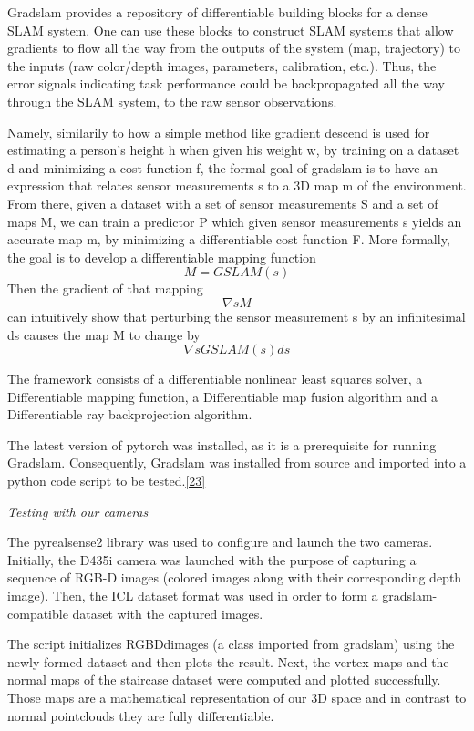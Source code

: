 \documentclass{article}
\begin{document}
Gradslam provides a repository of differentiable building blocks for a dense SLAM system. One can use these blocks to construct SLAM systems that allow gradients to flow all the way from the outputs of the system (map, trajectory) to the inputs (raw color/depth images, parameters, calibration, etc.). Thus, the error signals indicating task performance could be backpropagated all the way through the SLAM system, to the raw sensor observations.

Namely, similarily to how a simple method like gradient descend is used for estimating a person's height h when given his weight w, by training on a dataset d and minimizing a cost function f, the formal goal of gradslam is to have an expression that relates sensor measurements s to a 3D map m of the environment. From there, given a dataset with a set of sensor measurements S and a set of maps M, we can train a predictor P which given sensor measurements s yields an accurate map m, by minimizing a differentiable cost function F. More formally, the goal is to develop a differentiable mapping function $$ M = GSLAM(s)$$ Then the gradient of that mapping $$\nabla sM$$ can intuitively show that perturbing the sensor measurement s by an infinitesimal ds causes the map M to change by $$\nabla sGSLAM(s)ds$$

\bigskip

The framework consists of a differentiable nonlinear least squares solver, a Differentiable mapping function, a Differentiable map fusion algorithm and a Differentiable ray backprojection algorithm. 

The latest version of pytorch was installed, as it is a prerequisite for running Gradslam. Consequently, Gradslam was installed from source and imported into a python code script to be tested.\href{https://gradslam.readthedocs.io/en/latest/tutorials/tutorial_prerequisits.html}{[23]}

\bigskip
\textit{Testing with our cameras}
\bigskip

The pyrealsense2 library was used to configure and launch the two cameras. Initially, the D435i camera was launched with the purpose of capturing a sequence of RGB-D images (colored images along with their corresponding depth image). Then, the ICL dataset format was used in order to form a gradslam-compatible dataset with the captured images. 

The script initializes RGBDdimages (a class imported from gradslam) using the newly formed dataset and then plots the result. Next, the vertex maps and the normal maps of the staircase dataset were computed and plotted successfully. Those maps are a mathematical representation of our 3D space and in contrast to normal pointclouds they are fully differentiable.
\end{document}
